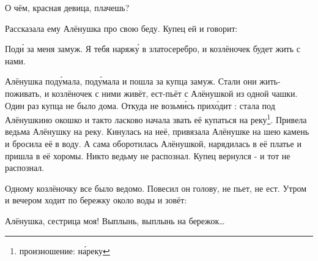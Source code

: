 %
\begin{dialogue}
    \item О чём, красная девица, плачешь?
\end{dialogue}
Рассказала ему Алёнушка про свою беду. Купец ей и говорит:
\begin{dialogue}
    \item Под\'{и} за меня замуж. Я тебя наряж\'{у} в златосеребро, и козлёночек будет жить с нами.
\end{dialogue}
Алёнушка под\'{у}мала, под\'{у}мала и пошла за купца замуж. Стали они жить-поживать, и козлёночек с ними живёт, ест-пьёт с Алёнушкой из одной чашки. Один раз купца не было дома. Откуда не возьм\'{и}сь прих\'{о}дит : стала под Алёнушкино окошко и такто ласково начала звать её купаться на реку\footnote{произношение: н\'{а}реку}. Привела ведьма Алёнушку на реку. Кинулась на неё, привязала Алёнушке на шею камень и бросила её в воду. А сама оборотилась Алёнушкой, нарядилась в её платье и пришла в её хоромы. Никто ведьму не распознал. Купец вернулся - и тот не распознал.

Одному козлёночку все было ведомо. Повесил он голову, не пьет, не ест. Утром и вечером ходит по бережку около воды и зовёт:
\begin{dialogue}
    \item Алёнушка, сестрица моя! Выплынь, выплынь на бережок\dots
\end{dialogue}

